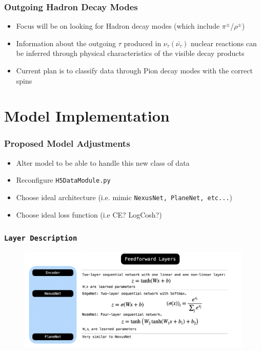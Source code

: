 \documentclass{beamer}
\begin{document}
\begin{frame}
\frametitle{Outgoing Hadron Decay Modes}
	\begin{itemize}
		\item Focus will be on looking for Hadron decay modes (which include $\pi^{\pm}$/$\rho^{\pm}$)
        \item Information about the outgoing $\tau$ produced in $\nu_{\tau}(\bar{\nu_{\tau}})$ nuclear reactions can be inferred through physical characteristics of the visible decay products
		\item Current plan is to classify data through Pion decay modes with the correct spins
	\end{itemize}
\end{frame}


\section{Model Implementation}


\begin{frame}
\frametitle{Proposed Model Adjustments}
	\begin{itemize}
		\item Alter model to be able to handle this new class of data

		\item Reconfigure \texttt{H5DataModule.py}
		\item Choose ideal architecture (i.e. mimic \texttt{NexusNet, PlaneNet, etc...})
		\item Choose ideal loss function (i.e CE? LogCosh?)
	\end{itemize}
\end{frame}


\begin{frame}
	\frametitle{\texttt{Layer Description}}
		\begin{figure}[h!]
			\includegraphics[width=1\textwidth]{images/model3.png}
			\label{model3}
		\end{figure}
\end{frame}
\end{document}
